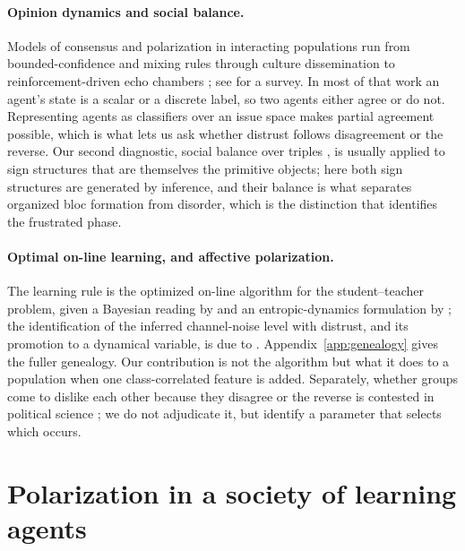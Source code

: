 \documentclass{article}
\begin{document}
\paragraph{Opinion dynamics and social balance.} Models of consensus and
polarization in interacting populations run from bounded-confidence and mixing
rules \citep{deffuant2000mixing,hegselmann2002opinion} through culture
dissemination \citep{axelrod1997dissemination} to reinforcement-driven echo
chambers \citep{baumann2020modeling}; see \citet{castellano2009statistical} for a
survey. In most of that work an agent's state is a scalar or a discrete label, so
two agents either agree or do not. Representing agents as classifiers over an
issue space \citep{caticha2011agent} makes partial agreement possible, which is
what lets us ask whether distrust follows disagreement or the reverse. Our second
diagnostic, social balance over triples
\citep{heider1946attitudes,cartwright1956structural,antal2005dynamics,marvel2011continuous},
is usually applied to sign structures that are themselves the primitive objects;
here both sign structures are generated by inference, and their balance is what
separates organized bloc formation from disorder, which is the distinction that identifies the frustrated phase.

\paragraph{Optimal on-line learning, and affective polarization.} The learning rule
is the optimized on-line algorithm for the student--teacher problem, given a Bayesian
reading by \citet{opper1996online} and an entropic-dynamics formulation by
\citet{caticha2020entropic}; the identification of the inferred channel-noise level
with distrust, and its promotion to a dynamical variable, is due to
\citet{alves2016distrust}. Appendix~\ref{app:genealogy} gives the fuller genealogy.
Our contribution is not the algorithm but what it does to a population when one
class-correlated feature is added. Separately, whether groups come to dislike each
other because they disagree or the reverse is contested in political science
\citep{fiorina2008polarization,iyengar2012affect,iyengar2015fear}; we do not
adjudicate it, but identify a parameter that selects which occurs.


\section{Polarization in a society of learning agents}
\label{sec:model}
\end{document}
